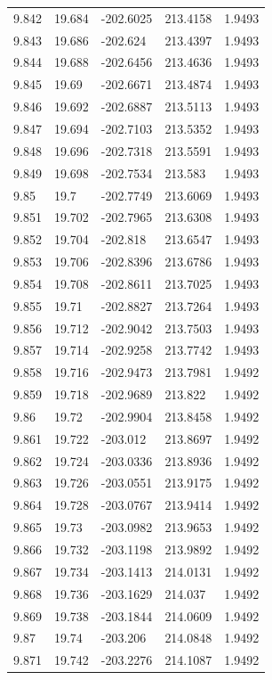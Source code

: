 \begin{tabular}{lllll}
9.842 & 19.684 & -202.6025 & 213.4158 & 1.9493 \\
9.843 & 19.686 & -202.624 & 213.4397 & 1.9493 \\
9.844 & 19.688 & -202.6456 & 213.4636 & 1.9493 \\
9.845 & 19.69 & -202.6671 & 213.4874 & 1.9493 \\
9.846 & 19.692 & -202.6887 & 213.5113 & 1.9493 \\
9.847 & 19.694 & -202.7103 & 213.5352 & 1.9493 \\
9.848 & 19.696 & -202.7318 & 213.5591 & 1.9493 \\
9.849 & 19.698 & -202.7534 & 213.583 & 1.9493 \\
9.85 & 19.7 & -202.7749 & 213.6069 & 1.9493 \\
9.851 & 19.702 & -202.7965 & 213.6308 & 1.9493 \\
9.852 & 19.704 & -202.818 & 213.6547 & 1.9493 \\
9.853 & 19.706 & -202.8396 & 213.6786 & 1.9493 \\
9.854 & 19.708 & -202.8611 & 213.7025 & 1.9493 \\
9.855 & 19.71 & -202.8827 & 213.7264 & 1.9493 \\
9.856 & 19.712 & -202.9042 & 213.7503 & 1.9493 \\
9.857 & 19.714 & -202.9258 & 213.7742 & 1.9493 \\
9.858 & 19.716 & -202.9473 & 213.7981 & 1.9492 \\
9.859 & 19.718 & -202.9689 & 213.822 & 1.9492 \\
9.86 & 19.72 & -202.9904 & 213.8458 & 1.9492 \\
9.861 & 19.722 & -203.012 & 213.8697 & 1.9492 \\
9.862 & 19.724 & -203.0336 & 213.8936 & 1.9492 \\
9.863 & 19.726 & -203.0551 & 213.9175 & 1.9492 \\
9.864 & 19.728 & -203.0767 & 213.9414 & 1.9492 \\
9.865 & 19.73 & -203.0982 & 213.9653 & 1.9492 \\
9.866 & 19.732 & -203.1198 & 213.9892 & 1.9492 \\
9.867 & 19.734 & -203.1413 & 214.0131 & 1.9492 \\
9.868 & 19.736 & -203.1629 & 214.037 & 1.9492 \\
9.869 & 19.738 & -203.1844 & 214.0609 & 1.9492 \\
9.87 & 19.74 & -203.206 & 214.0848 & 1.9492 \\
9.871 & 19.742 & -203.2276 & 214.1087 & 1.9492 \\

\end{tabular}
